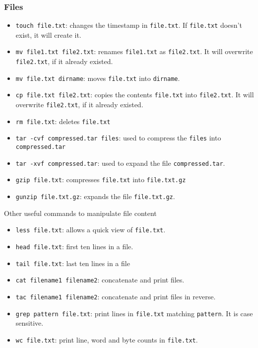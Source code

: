 \documentclass{article}
\begin{document}
\subsubsection*{Files}
\begin{itemize}
\item  \verb"touch file.txt": changes the timestamp in \verb"file.txt". If \verb"file.txt" doesn't exist, it will create it.
\item\verb"mv file1.txt file2.txt": renames \verb"file1.txt" as \verb"file2.txt". It will overwrite \verb"file2.txt", if it already existed.
\item\verb"mv file.txt dirname": moves \verb"file.txt" into \verb"dirname".
\item\verb"cp file.txt file2.txt": copies the contents \verb"file.txt" into \verb"file2.txt". It will overwrite \verb"file2.txt", if it already existed.
\item\verb"rm file.txt": deletes \verb"file.txt"
\item\verb"tar -cvf compressed.tar files": used to compress the \verb"files" into \verb"compressed.tar"
\item\verb"tar -xvf compressed.tar": used to expand the file \verb"compressed.tar".
\item \verb"gzip file.txt": compresses \verb"file.txt" into \verb"file.txt.gz"
\item \verb"gunzip file.txt.gz": expands the file \verb"file.txt.gz".
\end{itemize}



Other useful commands to manipulate file content
\begin{itemize}
\item\verb"less file.txt": allows a quick view of \verb"file.txt".
\item\verb"head file.txt": first ten lines in a file.
\item\verb"tail file.txt": last ten lines in a file
\item\verb"cat filename1 filename2": concatenate and print files.
\item\verb"tac filename1 filename2": concatenate and print files in reverse.
\item\verb"grep pattern file.txt": print lines in \verb"file.txt"
  matching \verb"pattern". It is case sensitive.
\item\verb"wc file.txt": print line, word and byte counts in \verb"file.txt". 
\end{itemize}
\end{document}
